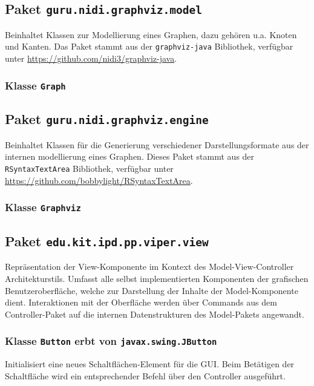 \documentclass[parskip=full,11pt,twoside]{scrartcl}
\begin{document}
\subsection{Paket \texttt{guru.nidi.graphviz.model}}

Beinhaltet Klassen zur Modellierung eines Graphen, dazu gehören u.a. Knoten und Kanten. Das Paket stammt aus der \texttt{graphviz-java} Bibliothek, verfügbar unter \url{https://github.com/nidi3/graphviz-java}.

\subsubsection{Klasse \texttt{Graph}}

\subsection{Paket \texttt{guru.nidi.graphviz.engine}}

Beinhaltet Klassen für die Generierung verschiedener Darstellungsformate aus der internen modellierung eines Graphen. Dieses Paket stammt aus der \texttt{RSyntaxTextArea} Bibliothek, verfügbar unter \url{https://github.com/bobbylight/RSyntaxTextArea}.

\subsubsection{Klasse \texttt{Graphviz}}

\subsection{Paket \texttt{edu.kit.ipd.pp.viper.view}}

Repräsentation der View-Komponente im Kontext des Model-View-Controller Architekturstils. Umfasst alle selbst implementierten Komponenten der grafischen Benutzeroberfläche, welche zur Darstellung der Inhalte der Model-Komponente dient. Interaktionen mit der Oberfläche werden über Commands aus dem Controller-Paket auf die internen Datenstrukturen des Model-Pakets angewandt.

\subsubsection{Klasse \texttt{Button} erbt von \texttt{javax.swing.JButton}}

Initialisiert eine neues Schaltflächen-Element für die GUI. Beim Betätigen der Schaltfläche wird ein entsprechender Befehl über den Controller ausgeführt.
\end{document}

